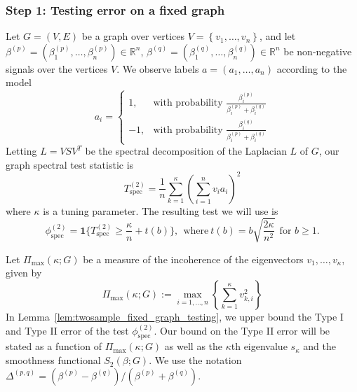 \documentclass{article}
\newcommand{\Reals}{\mathbb{R}}
\newcommand{\set}[1]{\left\{#1\right\}}
\newcommand{\1}{\mathbf{1}}
\newcommand{\betap}{\beta^{(p)}}
\newcommand{\betaq}{\beta^{(q)}}
\newcommand{\spec}{\mathrm{spec}}
\theoremstyle{alden}
\theoremstyle{aldenthm}
\theoremstyle{definition}
\theoremstyle{remark}
\begin{document}
\subsubsection{Step 1: Testing error on a fixed graph}

Let $G = (V,E)$ be a graph over vertices $V = \set{v_1,\ldots,v_n}$, and let $\beta^{(p)} = (\beta_1^{(p)},\ldots,\beta_n^{(p)}) \in \Reals^n$, $\beta^{(q)} = (\beta_1^{(q)},\ldots,\beta_n^{(q)}) \in \Reals^n$ be non-negative signals over the vertices $V$. We observe labels $a = (a_1,\ldots,a_n)$ according to the model
\begin{equation*}
a_i = 
\begin{cases*}
1, & \textrm{with probability $\frac{\betap_i}{\betap_i + \betaq_i}$} \\
-1, & \textrm{with probability $\frac{\betaq_i}{\betap_i + \betaq_i}$}
\end{cases*}
\end{equation*}
Letting $L = VSV^T$ be the spectral decomposition of the Laplacian $L$ of $G$, our graph spectral test statistic is 
\begin{equation*}
T_{\spec}^{(2)} = \frac{1}{n}\sum_{k = 1}^{\kappa} \left(\sum_{i = 1}^{n} v_i a_i\right)^2
\end{equation*}
where $\kappa$ is a tuning parameter. The resulting test we will use is
\begin{equation*}
\phi_{\spec}^{(2)} = \1\{T_{\spec}^{(2)} \geq \frac{\kappa}{n} + t(b)\},~~\textrm{where}~ t(b) = b\sqrt{\frac{2\kappa}{n^2}}~~\textrm{for $b \geq 1$.}
\end{equation*}

Let $\Pi_{\max}(\kappa;G)$ be a measure of the incoherence of the eigenvectors $v_1,\ldots,v_\kappa$, given by
\begin{equation*}
\Pi_{\max}(\kappa;G) := \max_{i = 1,\ldots,n} \left\{\sum_{k = 1}^{\kappa} v_{k,i}^2\right\}
\end{equation*}
In Lemma~\ref{lem:twosample_fixed_graph_testing}, we upper bound the Type I and Type II error of the test $\phi_{\spec}^{(2)}$. Our bound on the Type II error will be stated as a function of $\Pi_{\max}(\kappa;G)$ as well as the $\kappa$th eigenvalue $s_{\kappa}$ and the smoothness functional $S_2(\beta;G)$. We use the notation $\varDelta^{(p,q)} = (\betap - \betaq)/(\betap + \betaq)$.
\end{document}
